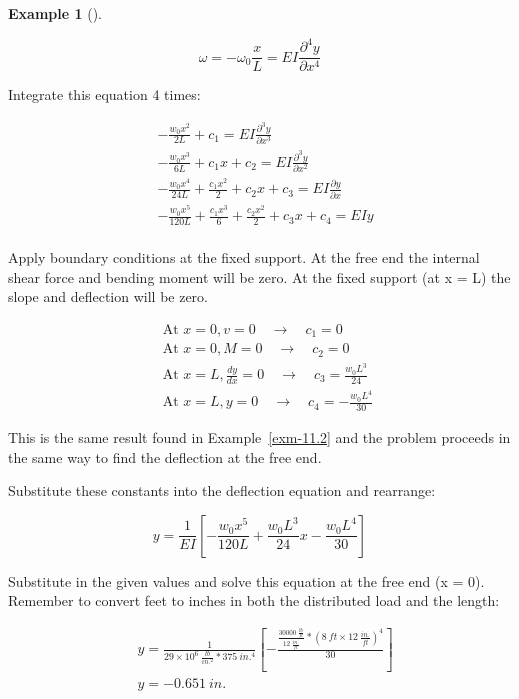 \documentclass[
  letterpaper,
  DIV=11,
  numbers=noendperiod]{scrreprt}
\theoremstyle{definition}
\newtheorem{example}{Example}[chapter]
\theoremstyle{remark}
\begin{document}
\begin{tcolorbox}
\begin{example}[]
\begin{tcolorbox}
\[
\omega=-\omega_0 \frac{x}{L}=E I \frac{\partial^4 y}{\partial x^4}
\]

Integrate this equation 4 times:

\[
\begin{aligned} & -\frac{w_0 x^2}{2 L}+c_1=E I \frac{\partial^3 y}{\partial x^3} \\ & -\frac{w_0 x^3}{6 L}+c_1 x+c_2=EI\frac{\partial^3 y}{\partial x^2} \\ & -\frac{w_0 x^4}{24 L}+\frac{c_1 x^2}{2}+c_2 x+c_3=E I \frac{\partial y}{\partial x} \\ & -\frac{w_0 x^5}{120L}+\frac{c_1 x^3}{6}+\frac{c_2 x^2}{2}+c_3 x+c_4=EIy \\ & \end{aligned}
\]

Apply boundary conditions at the fixed support. At the free end the
internal shear force and bending moment will be zero. At the fixed
support (at x = L) the slope and deflection will be zero.

\[
\begin{aligned} &\text { At } x=0, v=0 \quad \rightarrow \quad c_1=0 \\ &\text { At } x=0, M=0 \quad \rightarrow \quad c_2=0 \\ &\text { At } x=L, \frac{d y}{d x}=0 \quad \rightarrow \quad c_3=\frac{w_0 L^3}{24} \\ &\text { At } x=L, y=0 \quad \rightarrow \quad c_4=-\frac{w_0L^4}{30} \end{aligned}
\]

This is the same result found in Example~\ref{exm-11.2} and the problem
proceeds in the same way to find the deflection at the free end.

Substitute these constants into the deflection equation and rearrange:

\[
y=\frac{1}{E I}\left[-\frac{w_0 x^5}{120L}+\frac{w_0 L^3}{24} x-\frac{w_0 L^4}{30}\right]
\]

Substitute in the given values and solve this equation at the free end
(x = 0). Remember to convert feet to inches in both the distributed load
and the length:

\[
\begin{aligned}
& y=\frac{1}{29 \times 10^6~\frac{lb}{in.^2}*375{~in.^4}} \left[-\frac{\frac{30000~\frac{lb}{ft}}{12~\frac{in.}{ft}}*(8{~ft}\times12~\frac{in.}{ft})^4}{30}\right] \\
& y=- 0.651{~in.}\end{aligned}
\]

\end{tcolorbox}

\end{example}

\end{tcolorbox}
\end{document}
